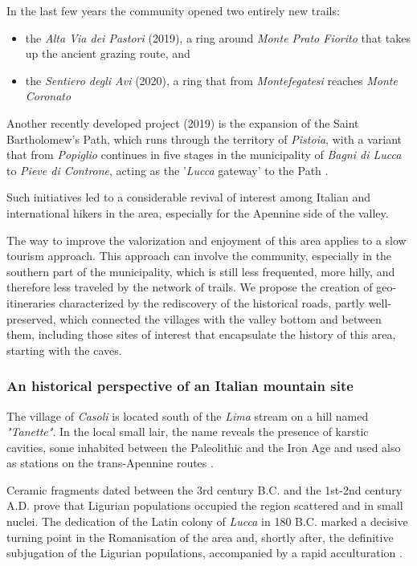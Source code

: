 \documentclass[sustainability,article,submit,pdftex,moreauthors]{Definitions/mdpi}
\begin{document}
In the last few years the community opened two entirely new trails:
\begin{itemize}
	\item the \textit{Alta Via dei Pastori} (2019), a ring around \textit{Monte Prato Fiorito} that takes up the ancient grazing route, and
	\item the \textit{Sentiero degli Avi} (2020), a ring that from \textit{Montefegatesi}
	reaches \textit{Monte Coronato} \cite{pin21}
\end{itemize}

Another recently developed project (2019) is the expansion of the Saint Bartholomew's Path, which runs through the territory of \textit{Pistoia}, with a
variant that from \textit{Popiglio} continues in five stages in the municipality of \emph{Bagni di Lucca} to \textit{Pieve di Controne}, acting as the '\emph{Lucca} gateway' to the Path \cite{camsb}.

Such initiatives led to a considerable revival of interest among Italian and international hikers in the area, especially for the Apennine side of the valley.

The way to improve the valorization and enjoyment of this area applies to a slow tourism approach. This approach can involve the community, especially in the southern part of the municipality, which is still less frequented, more hilly, and therefore less traveled by the network of trails. We propose the creation of geo-itineraries characterized by the rediscovery of the historical roads, partly well-preserved, which connected the villages with the valley bottom and between them, including those sites of interest that encapsulate the history of this area, starting with the caves.

\subsubsection{An historical perspective of an Italian mountain site}

 The village of \emph{Casoli} is located south of the \emph{Lima} stream on a hill named {\em "Tanette"}. In the local small lair, the name reveals the presence of karstic cavities, some inhabited between the Paleolithic and the Iron Age and used also as stations on the trans-Apennine routes \cite{men76, gia96, pal63, zec72a, zec72b}.

Ceramic fragments dated between the 3rd century B.C. and the 1st-2nd century A.D. prove that Ligurian populations occupied the region scattered and in small nuclei. The dedication of the Latin colony of \textit{Lucca} in 180 B.C. marked a decisive turning point in the Romanisation of the area and, shortly after, the definitive subjugation of the Ligurian populations, accompanied by a rapid acculturation \cite{gia96, cia05}.
\end{document}
